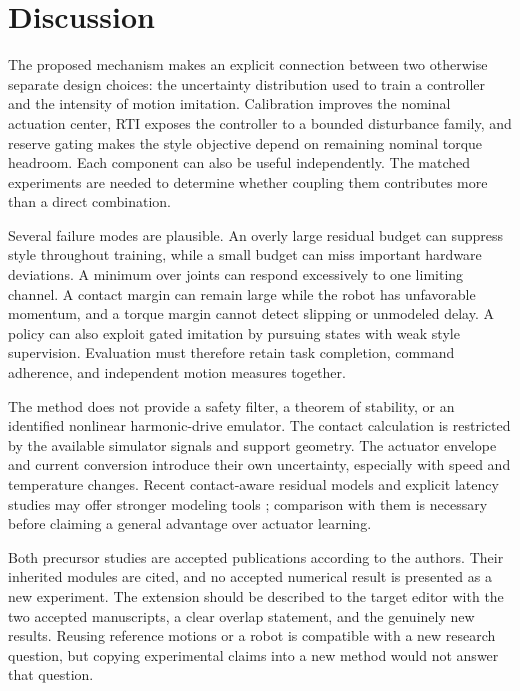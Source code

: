\documentclass[11pt,a4paper]{article}
\begin{document}
\section{Discussion}
The proposed mechanism makes an explicit connection between two otherwise separate design choices: the uncertainty distribution used to train a controller and the intensity of motion imitation. Calibration improves the nominal actuation center, RTI exposes the controller to a bounded disturbance family, and reserve gating makes the style objective depend on remaining nominal torque headroom. Each component can also be useful independently. The matched experiments are needed to determine whether coupling them contributes more than a direct combination.

Several failure modes are plausible. An overly large residual budget can suppress style throughout training, while a small budget can miss important hardware deviations. A minimum over joints can respond excessively to one limiting channel. A contact margin can remain large while the robot has unfavorable momentum, and a torque margin cannot detect slipping or unmodeled delay. A policy can also exploit gated imitation by pursuing states with weak style supervision. Evaluation must therefore retain task completion, command adherence, and independent motion measures together.

The method does not provide a safety filter, a theorem of stability, or an identified nonlinear harmonic-drive emulator. The contact calculation is restricted by the available simulator signals and support geometry. The actuator envelope and current conversion introduce their own uncertainty, especially with speed and temperature changes. Recent contact-aware residual models and explicit latency studies may offer stronger modeling tools \cite{contactuan,delay}; comparison with them is necessary before claiming a general advantage over actuator learning.

Both precursor studies are accepted publications according to the authors. Their inherited modules are cited, and no accepted numerical result is presented as a new experiment. The extension should be described to the target editor with the two accepted manuscripts, a clear overlap statement, and the genuinely new results. Reusing reference motions or a robot is compatible with a new research question, but copying experimental claims into a new method would not answer that question.
\end{document}
